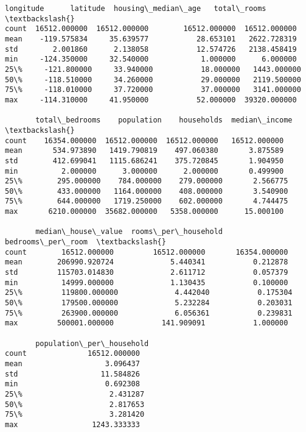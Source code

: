 \documentclass[11pt]{article}
\newcommand{\prompt}[4]{
        \llap{{\color{#2}[#3]: #4}}\vspace{-1.25em}
    }
\begin{document}
            \begin{tcolorbox}[breakable, boxrule=.5pt, size=fbox, pad at break*=1mm, opacityfill=0]
\prompt{Out}{outcolor}{56}{\hspace{3.5pt}}
\begin{Verbatim}[commandchars=\\\{\}]
          longitude      latitude  housing\_median\_age   total\_rooms  \textbackslash{}
count  16512.000000  16512.000000        16512.000000  16512.000000
mean    -119.575834     35.639577           28.653101   2622.728319
std        2.001860      2.138058           12.574726   2138.458419
min     -124.350000     32.540000            1.000000      6.000000
25\%     -121.800000     33.940000           18.000000   1443.000000
50\%     -118.510000     34.260000           29.000000   2119.500000
75\%     -118.010000     37.720000           37.000000   3141.000000
max     -114.310000     41.950000           52.000000  39320.000000

       total\_bedrooms    population    households  median\_income  \textbackslash{}
count    16354.000000  16512.000000  16512.000000   16512.000000
mean       534.973890   1419.790819    497.060380       3.875589
std        412.699041   1115.686241    375.720845       1.904950
min          2.000000      3.000000      2.000000       0.499900
25\%        295.000000    784.000000    279.000000       2.566775
50\%        433.000000   1164.000000    408.000000       3.540900
75\%        644.000000   1719.250000    602.000000       4.744475
max       6210.000000  35682.000000   5358.000000      15.000100

       median\_house\_value  rooms\_per\_household  bedrooms\_per\_room  \textbackslash{}
count        16512.000000         16512.000000       16354.000000
mean        206990.920724             5.440341           0.212878
std         115703.014830             2.611712           0.057379
min          14999.000000             1.130435           0.100000
25\%         119800.000000             4.442040           0.175304
50\%         179500.000000             5.232284           0.203031
75\%         263900.000000             6.056361           0.239831
max         500001.000000           141.909091           1.000000

       population\_per\_household
count              16512.000000
mean                   3.096437
std                   11.584826
min                    0.692308
25\%                    2.431287
50\%                    2.817653
75\%                    3.281420
max                 1243.333333
\end{Verbatim}
\end{tcolorbox}
        
\end{document}
